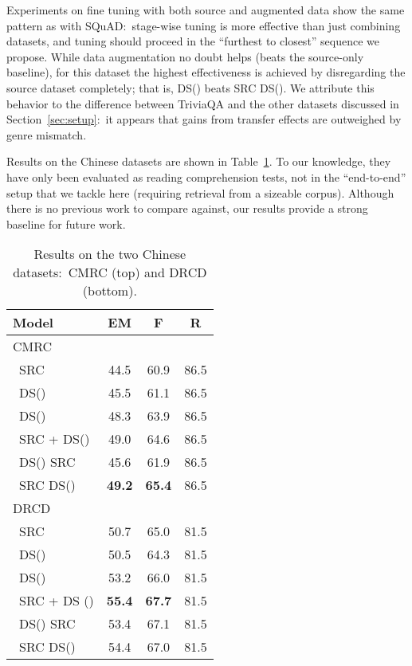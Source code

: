 \documentclass[11pt,a4paper]{article}
\begin{document}
Experiments on fine tuning with both source and augmented data show the same pattern as with SQuAD:\ stage-wise tuning is more effective than just combining datasets, and tuning should proceed in the ``furthest to closest'' sequence we propose.
While data augmentation no doubt helps (beats the source-only baseline), for this dataset the highest effectiveness is achieved by disregarding the source dataset completely; that is, DS() beats SRC  DS().
We attribute this behavior to the difference between TriviaQA and the other datasets discussed in Section~\ref{sec:setup}:\ it appears that gains from transfer effects are outweighed by genre mismatch.

Results on the Chinese datasets are shown in Table~\ref{table:chinese}.
To our knowledge, they have only been evaluated as reading comprehension tests, not in the ``end-to-end'' setup that we tackle here (requiring retrieval from a sizeable corpus).
Although there is no previous work to compare against, our results provide a strong baseline for future work.

\begin{table}[t]
\centering\begin{tabular}{lccc}
\toprule
Model 					& EM 	& F 	& R 	\\
\toprule
CMRC \\
~SRC            				& 44.5	&60.9       & 86.5 \\ 
~DS()       				& 45.5	&61.1  	& 86.5\\
~DS()     				& 48.3	&63.9  	& 86.5\\
~SRC + DS()			& 49.0	& 64.6	& 86.5	 \\
~DS()  SRC  &45.6 & 61.9 & 86.5 \\
~SRC  DS()	& \textbf{49.2}&\textbf{65.4}& 86.5 \\
\midrule
DRCD\\
~SRC      					& 50.7	&65.0       & 81.5   \\ 
~DS() 					&50.5	&64.3       & 81.5 \\ 
~DS()				& 53.2	&66.0       & 81.5\\ 
~SRC + DS ()			& \textbf{55.4}	& \textbf{67.7}	& 81.5	 \\
~DS()  SRC  &53.4	& 67.1	& 81.5 \\
~SRC  DS() &54.4 	&67.0	& 81.5\\
\bottomrule
\end{tabular}
\caption{Results on the two Chinese datasets:\ CMRC (top) and DRCD (bottom).}
\label{table:chinese}
\end{table}
\end{document}
